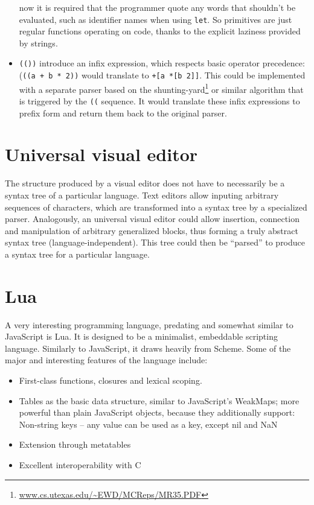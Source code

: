 \begin{itemize}
      now it is required that the programmer quote any words that shouldn't be
      evaluated, such as identifier names when using \texttt{let}. So primitives
      are just regular functions operating on code, thanks to the explicit
      laziness provided by strings.
    \item \texttt{(())} introduce an infix expression, which respects basic
      operator precedence: (\texttt{((a + b * 2))} would translate to
      \texttt{+[a *[b 2]]}. This could be implemented with a separate parser
      based on the
      shunting-yard\footnote{\url{www.cs.utexas.edu/~EWD/MCReps/MR35.PDF}} or
      similar algorithm that is triggered by the \texttt{((} sequence. It would
      translate these infix expressions to prefix form and return them back to
      the original parser.
\end{itemize}

\section{Universal visual editor}
The structure produced by a visual editor does not have to necessarily be a
syntax tree of a particular language.  Text editors allow inputing arbitrary
sequences of characters, which are transformed into a syntax tree by a
specialized parser. Analogously, an universal visual editor could allow
insertion, connection and manipulation of arbitrary generalized blocks, thus
forming a truly abstract syntax tree (language-independent). This tree could
then be ``parsed'' to produce a syntax tree for a particular language.

\section{Lua}
A very interesting programming language, predating and somewhat similar to JavaScript is Lua. It is designed to be a minimalist, embeddable scripting language. Similarly to JavaScript, it draws heavily from Scheme. Some of the major and interesting features of the language include:
\begin{itemize}
    \item First-class functions, closures and lexical scoping.
    \item Tables as the basic data structure, similar to JavaScript's WeakMaps; more powerful than plain JavaScript objects, because they additionally support:
    Non-string keys -- any value can be used as a key, except nil and NaN
    \item Extension through metatables
    \item Excellent interoperability with C
\end{itemize} 


